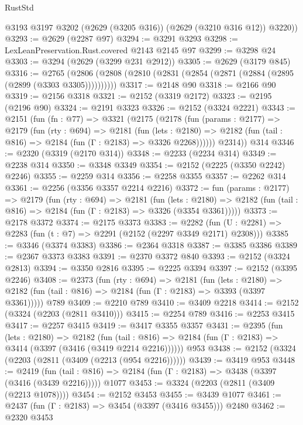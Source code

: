 \begin{lexlean}{RustStd}
\begin{coremodule}
        @3193
        @3197
        @3202
        (@2629 (@3205 @316))
        (@2629 (@3210 @316 @12))
        @3220))
@3293 := @2629 (@2287 @97)
@3294 := @3291 @3293
@3298 := LexLeanPreservation.Rust.covered @2143 @2145 @97
@3299 := @3298 @24
@3303 := @3294 (@2629 (@3299 @231 @2912))
@3305 := @2629 (@3179 @845)
@3316 := @2765 (@2806 (@2808 (@2810 (@2831 (@2854 (@2871 (@2884 (@2895 (@2899 (@3303 @3305))))))))))
@3317 := @2148 @90
@3318 := @2166 @90
@3319 := @2156 @3318
@3321 := @2152 (@3319 @2172)
@3323 := @2195 (@2196 @90)
@3324 := @2191 @3323
@3326 := @2152 (@3324 @2221)
@3343 := @2151
    (fun (fn : @77) =>
    @3321
      (@2175
        (@2178
          (fun (params : @2177) =>
          @2179
            (fun (rty : @694) =>
            @2181
              (fun (lets : @2180) =>
              @2182 (fun (tail : @816) => @2184 (fun (Γ : @2183) => @3326 @2268))))))
        @2314))
    @314
@3346 := @2320 (@3319 (@2170 @314))
@3348 := @2233 (@2234 @314)
@3349 := @2238 @314
@3350 := @3348 @3349
@3354 := @2152 (@2225 (@3350 @2242) @2246)
@3355 := @2259 @314
@3356 := @2258 @3355
@3357 := @2262 @314
@3361 := @2256 (@3356 @3357 @2214 @2216)
@3372 := fun (params : @2177) =>
  @2179
    (fun (rty : @694) =>
    @2181
      (fun (lets : @2180) =>
      @2182 (fun (tail : @816) => @2184 (fun (Γ : @2183) => @3326 (@3354 @3361)))))
@3373 := @2178 @3372
@3374 := @2175 @3373
@3383 := @2282 (fun (U : @2281) => @2283 (fun (t : @7) => @2291 (@2152 (@2297 @3349 @2171) @2308)))
@3385 := @3346 (@3374 @3383)
@3386 := @2364 @3318
@3387 := @3385 @3386
@3389 := @2367 @3373 @3383
@3391 := @2370 @3372 @840
@3393 := @2152 (@3324 @2813)
@3394 := @3350 @2816
@3395 := @2225 @3394
@3397 := @2152 (@3395 @2246)
@3408 := @2373
    (fun (rty : @694) =>
    @2181
      (fun (lets : @2180) =>
      @2182 (fun (tail : @816) => @2184 (fun (Γ : @2183) => @3393 (@3397 @3361)))))
    @789
@3409 := @2210 @789
@3410 := @3409 @2218
@3414 := @2152 (@3324 (@2203 (@2811 @3410)))
@3415 := @2254 @789
@3416 := @2253 @3415
@3417 := @2257 @3415
@3419 := @3417 @3355 @3357
@3431 := @2395
    (fun (lets : @2180) =>
    @2182
      (fun (tail : @816) => @2184 (fun (Γ : @2183) => @3414 (@3397 (@3416 (@3419 @2214 @2216))))))
    @953
@3438 := @2152 (@3324 (@2203 (@2811 (@3409 (@2213 (@954 @2216))))))
@3439 := @3419 @953
@3448 := @2419
    (fun (tail : @816) => @2184 (fun (Γ : @2183) => @3438 (@3397 (@3416 (@3439 @2216)))))
    @1077
@3453 := @3324 (@2203 (@2811 (@3409 (@2213 @1078))))
@3454 := @2152 @3453
@3455 := @3439 @1077
@3461 := @2437 (fun (Γ : @2183) => @3454 (@3397 (@3416 @3455))) @2480
@3462 := @2320 @3453

\end{coremodule}
\end{lexlean}
